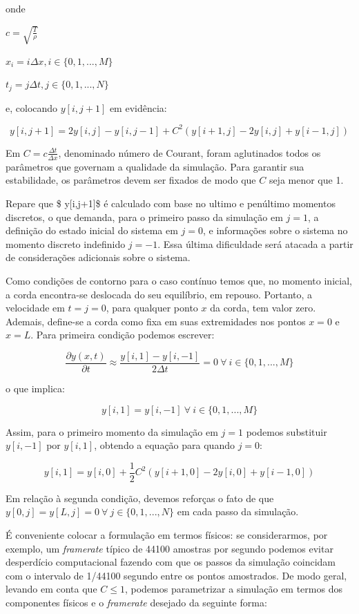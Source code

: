 \documentclass[]{article}
\begin{document}
onde

\(c=\sqrt{\frac{T}{\rho}}\)

\(x_i = i \Delta x, i \in \{0,1,...,M\}\)

\(t_j = j \Delta t, j \in \{0,1,...,N\}\)

e, colocando \(y[i,j+1]\) em evidência:

\[ y[i,j+1] = 2 y[i, j] - y[i,j-1] + C^2 (y[i+1, j] - 2 y[i, j] + y[i-1, j])\]

Em \(C=c \frac{\Delta t}{\Delta x}\), denominado número de Courant,
foram aglutinados todos os parâmetros que governam a qualidade da
simulação. Para garantir sua estabilidade, os parâmetros devem ser
fixados de modo que \(C\) seja menor que 1.

Repare que \$ y{[}i,j+1{]}\$ é calculado com base no ultimo e penúltimo
momentos discretos, o que demanda, para o primeiro passo da simulação em
\(j = 1\), a definição do estado inicial do sistema em \(j=0\), e
informações sobre o sistema no momento discreto indefinido \(j=-1\).
Essa última dificuldade será atacada a partir de considerações
adicionais sobre o sistema.

Como condições de contorno para o caso contínuo temos que, no momento
inicial, a corda encontra-se deslocada do seu equilíbrio, em repouso.
Portanto, a velocidade em \(t=j=0\), para qualquer ponto \(x\) da corda,
tem valor zero. Ademais, define-se a corda como fixa em suas
extremidades nos pontos \(x=0\) e \(x=L\). Para primeira condição
podemos escrever:

\[ \frac{\partial y(x,t)}{\partial t} \approx \frac{y[i,1]-y[i,-1]}{2 \Delta t} = 0 ~ \forall ~ i \in \{0,1,...,M\} \]

o que implica:

\[ y[i,1] = y[i,-1] ~ \forall ~ i \in \{0,1,...,M\} \]

Assim, para o primeiro momento da simulação em \(j=1\) podemos
substituir \(y[i,-1]\) por \(y[i,1]\), obtendo a equação para quando
\(j=0\):

\[ y[i, 1] = y[i, 0] + \frac{1}{2} C^2 (y[i+1, 0] - 2 y[i, 0] + y[i-1, 0])\]

Em relação à segunda condição, devemos reforças o fato de que
\(y[0, j] = y[L, j] = 0 ~ \forall ~ j \in \{0,1,...,N\}\) em cada passo
da simulação.

É conveniente colocar a formulação em termos físicos: se considerarmos,
por exemplo, um \emph{framerate} típico de 44100 amostras por segundo
podemos evitar desperdício computacional fazendo com que os passos da
simulação coincidam com o intervalo de 1/44100 segundo entre os pontos
amostrados. De modo geral, levando em conta que \(C \le 1\), podemos
parametrizar a simulação em termos dos componentes físicos e o
\emph{framerate} desejado da seguinte forma:
\end{document}
